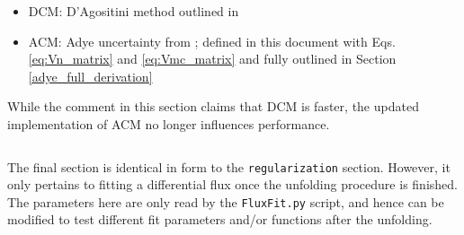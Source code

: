 \begin{itemize}
  \item DCM: D'Agositini method outlined in \cite{agostini}
  \item ACM: Adye uncertainty from \cite{adye2}; defined in this document with Eqs. \ref{eq:Vn_matrix} and \ref{eq:Vmc_matrix} and fully outlined in Section \ref{adye_full_derivation}
\end{itemize}

While the comment in this section claims that DCM is faster, the updated implementation of ACM no longer influences performance.


\noindent\hrulefill

\inputminted[firstline=64,lastline=80]{ini}{config_example.cfg}
The final section is identical in form to the \verb|regularization| section.
However, it only pertains to fitting a differential flux once the unfolding procedure is finished.
The parameters here are only read by the \verb|FluxFit.py| script, and hence
can be modified to test different fit parameters and/or functions after the unfolding.
